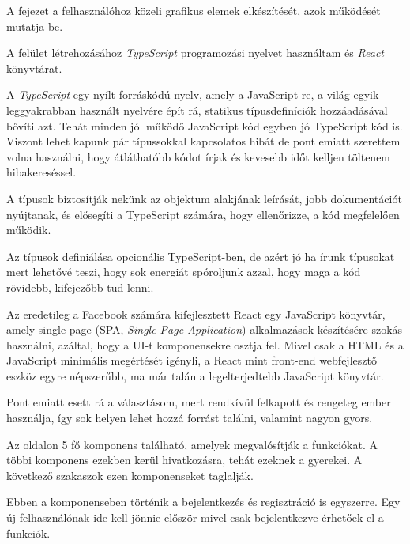 
A fejezet a felhasználóhoz közeli grafikus elemek elkészítését, azok működését mutatja be.


A felület létrehozásához \textit{TypeScript} \cite{typescript} programozási nyelvet használtam és \textit{React} \cite{react} könyvtárat.


A \textit{TypeScript} egy nyílt forráskódú nyelv, amely a JavaScript-re, a világ egyik leggyakrabban használt nyelvére épít rá, statikus típusdefiníciók hozzáadásával bővíti azt. Tehát minden jól működő JavaScript kód egyben jó TypeScript kód is. Viszont lehet kapunk pár típussokkal kapcsolatos hibát de pont emiatt szerettem volna használni, hogy átláthatóbb kódot írjak és kevesebb időt kelljen töltenem hibakereséssel. \bigskip

A típusok biztosítják nekünk az objektum alakjának leírását, jobb dokumentációt nyújtanak, és elősegíti a TypeScript számára, hogy ellenőrizze, a kód megfelelően működik.\bigskip

Az típusok definiálása opcionális TypeScript-ben, de azért jó ha írunk típusokat mert lehetővé teszi, hogy sok energiát spóroljunk azzal, hogy maga a kód rövidebb, kifejezőbb tud lenni.


Az eredetileg a Facebook számára kifejlesztett React egy JavaScript könyvtár, amely single-page (SPA, \textit{Single Page Application}) alkalmazások készítésére szokás használni, azáltal, hogy a UI-t komponensekre osztja fel. Mivel csak a HTML és a JavaScript minimális megértését igényli, a React mint front-end webfejlesztő eszköz egyre népszerűbb, ma már talán a legelterjedtebb JavaScript könyvtár. \bigskip

Pont emiatt esett rá a választásom, mert rendkívül felkapott és rengeteg ember használja, így sok helyen lehet hozzá forrást találni, valamint nagyon gyors.


Az oldalon 5 fő komponens található, amelyek megvalósítják a funkciókat. A többi komponens ezekben kerül hivatkozásra, tehát ezeknek a gyerekei. A következő szakaszok ezen komponenseket taglalják.


Ebben a komponenseben történik a bejelentkezés és regisztráció is egyszerre. Egy új felhasználónak ide kell jönnie először mivel csak bejelentkezve érhetőek el a funkciók.

